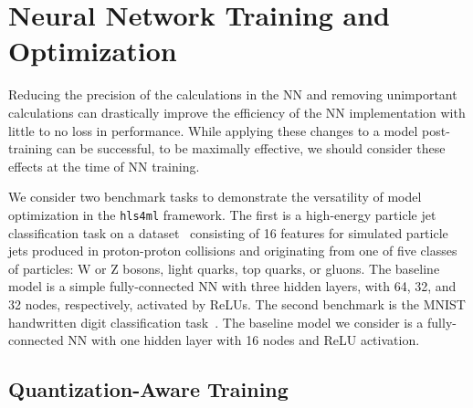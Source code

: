 \documentclass[sigconf]{acmart}
\newcommand{\hlsfml}{\texttt{hls4ml}\xspace}
\begin{document}

\section{Neural Network Training and Optimization}
\label{sec:nnto}


Reducing the precision of the calculations in the NN and removing unimportant calculations can drastically improve the efficiency of the NN implementation with little to no loss in performance. 
While applying these changes to a model post-training can be successful, to be maximally effective, we should consider these effects at the time of NN training.

We consider two benchmark tasks to demonstrate the versatility of model optimization in the \hlsfml framework.
The first is a high-energy particle jet classification task on a dataset~\cite{hls4mldata_150p,Coleman:2017fiq,Duarte:2018ite} consisting of 16 features for simulated particle jets produced in proton-proton collisions and originating from one of five classes of particles: W or Z bosons, light quarks, top quarks, or gluons.
The baseline model is a simple fully-connected NN with three hidden layers, with 64, 32, and 32 nodes, respectively, activated by ReLUs.
The second benchmark is the MNIST handwritten digit classification task~\cite{MNIST}. 
The baseline model we consider is a fully-connected NN with one hidden layer with 16 nodes and ReLU activation.

\subsection{Quantization-Aware Training}
\label{sec:qat}
\end{document}
